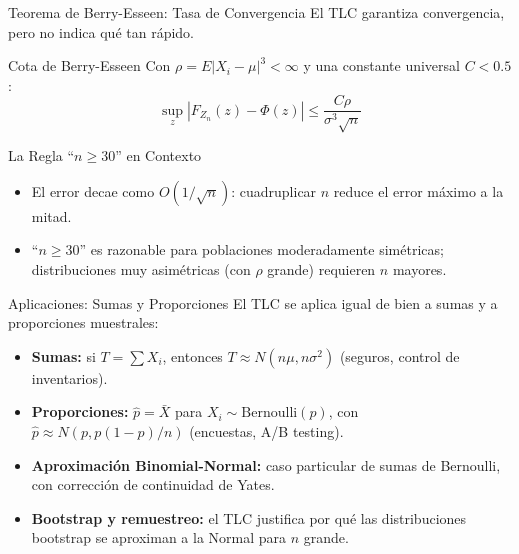 \documentclass[10pt, aspectratio=169]{beamer}
\begin{document}
\begin{frame}{Teorema de Berry-Esseen: Tasa de Convergencia}
  \footnotesize
  El TLC garantiza convergencia, pero no indica qué tan rápido. \pause

  \vspace{0.1cm}
  \begin{block}{Cota de Berry-Esseen}
    Con $\rho=E|X_i-\mu|^3<\infty$ y una constante universal $C<0.5$:
    $$\sup_z\left|F_{Z_n}(z)-\Phi(z)\right| \le \dfrac{C\rho}{\sigma^3\sqrt{n}}$$
  \end{block}

  \vspace{0.1cm}
  \pause
  \begin{alertblock}{La Regla ``$n\ge30$'' en Contexto}
    \begin{itemize}\itemsep=0.05cm
      \item El error decae como $O(1/\sqrt{n})$: cuadruplicar $n$ reduce el error máximo a la mitad.
      \item ``$n\ge30$'' es razonable para poblaciones moderadamente simétricas; distribuciones muy asimétricas (con $\rho$ grande) requieren $n$ mayores.
    \end{itemize}
  \end{alertblock}
\end{frame}

\begin{frame}{Aplicaciones: Sumas y Proporciones}
  \footnotesize
  El TLC se aplica igual de bien a sumas y a proporciones muestrales: \pause

  \vspace{0.15cm}
  \begin{itemize}\itemsep=0.12cm
    \item \textbf{Sumas:} si $T=\sum X_i$, entonces $T \approx N(n\mu, n\sigma^2)$ (seguros, control de inventarios). \pause
    \item \textbf{Proporciones:} $\hat{p}=\bar{X}$ para $X_i \sim \text{Bernoulli}(p)$, con $\hat{p} \approx N(p, p(1-p)/n)$ (encuestas, A/B testing). \pause
    \item \textbf{Aproximación Binomial-Normal:} caso particular de sumas de Bernoulli, con corrección de continuidad de Yates. \pause
    \item \textbf{Bootstrap y remuestreo:} el TLC justifica por qué las distribuciones bootstrap se aproximan a la Normal para $n$ grande.
  \end{itemize}
\end{frame}
\end{document}
